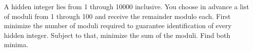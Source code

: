 A hidden integer lies from 1 through 10000 inclusive. You choose in advance a list of moduli from 1 through 100 and receive the remainder modulo each. First minimize the number of moduli required to guarantee identification of every hidden integer. Subject to that, minimize the sum of the moduli. Find both minima.
